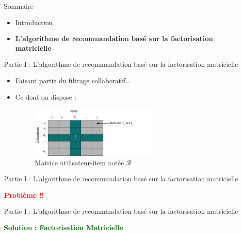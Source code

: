 \newcommand{\PartieI}{Partie I : L'algorithme de recommandation basé sur la factorisation matricielle}

\begin{frame}{Sommaire}
    \begin{itemize}
        \item Introduction
        \item \textbf{L'algorithme de recommandation basé sur la factorisation matricielle}
    \end{itemize}
\end{frame}

\begin{frame}{\PartieI}
    \begin{itemize}
        \item Faisant partie du filtrage collaboratif...
        \item {
              Ce dont on dispose :
              \begin{figure}[htbp]
                  \centering
                  \hspace{80pt}
                  \includegraphics[width=0.6\textwidth]{ressources/matrix_users_items.png}
                  \caption{Matrice utilisateur-item notée $\mathcal{R}$}
                  \label{fig:matrix-user-item}
              \end{figure}
              }
    \end{itemize}
\end{frame}

\begin{frame}{\PartieI}
    \begin{center}
        \textcolor{red}{\textbf{\large{Problème !!}}}
    \end{center}
\end{frame}

\begin{frame}{\PartieI}
    \begin{center}
        \textcolor{darkgreen}{\textbf{\large{Solution : Factorisation Matricielle}}}
    \end{center}
\end{frame}

